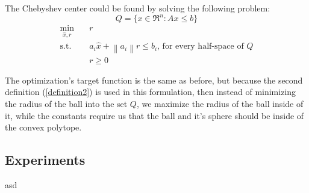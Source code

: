 \documentclass[]{article}
\newcommand{\norm}[1]{\left\lVert#1\right\rVert}
\newcommand{\Q}[0]{\textit{Q}}
\begin{document}
The Chebyshev center could be found by solving the following problem:
\[\Q = \{ x\in \Re^n : Ax\leq b\}\]
\begin{equation}
	\label{LP}
	\begin{aligned}
		\min_{\hat{x},r} \quad &r \\
		\text{s.t.}\quad & a_i \hat{x} + \norm{a_i}r \leq b_i \text{, for every half-space of } \Q \\
		\quad & r\geq 0
	\end{aligned}
\end{equation}

The optimization's target function is the same as before, but because the second definition (\ref{definition2}) is used in this formulation, then instead of minimizing the radius of the ball into the set $\Q$, we maximize the radius of the ball inside of it, while the constants require us that the ball and it's sphere should be inside of the convex polytope.
 
\subsection{Experiments}

asd

\printbibliography[
heading=bibintoc,
title={References}
]
\end{document}
